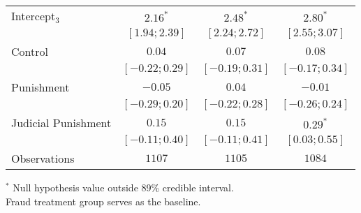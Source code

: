 \begin{table}[h]
\begin{center}
\begin{threeparttable}
\begin{tabular}{l c c c}
Intercept$_3$       & $2.16^{*}$        & $2.48^{*}$        & $2.80^{*}$        \\
                    & $ [ 1.94;  2.39]$ & $ [ 2.24;  2.72]$ & $ [ 2.55;  3.07]$ \\
Control             & $0.04$            & $0.07$            & $0.08$            \\
                    & $ [-0.22;  0.29]$ & $ [-0.19;  0.31]$ & $ [-0.17;  0.34]$ \\
Punishment          & $-0.05$           & $0.04$            & $-0.01$           \\
                    & $ [-0.29;  0.20]$ & $ [-0.22;  0.28]$ & $ [-0.26;  0.24]$ \\
Judicial Punishment & $0.15$            & $0.15$            & $0.29^{*}$        \\
                    & $ [-0.11;  0.40]$ & $ [-0.11;  0.41]$ & $ [ 0.03;  0.55]$ \\
\hline
Observations        & $1107$            & $1105$            & $1084$            \\
\hline
\end{tabular}
\begin{tablenotes}[flushleft]
\scriptsize{$^*$ Null hypothesis value outside 89\% credible interval.  \\
Fraud treatment group serves as the baseline.}
\end{tablenotes}
\end{threeparttable}
\label{table:coefficients}
\end{center}
\end{table}
